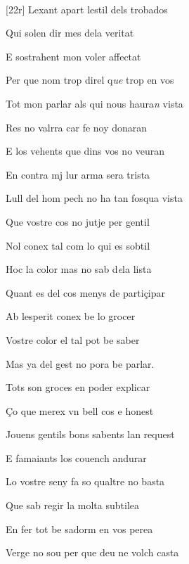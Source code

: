 \documentclass[12pt]{article}
\renewcommand{\espaiAbansEtiquetaPoema}{\vspace{0ex}}
\begin{document}
\begin{estrofa}

\espaiAbansEtiquetaPoema

\\

\end{estrofa}


\begin{estrofa}

 [22r] Lexant apart lestil dels trobados

 Qui solen dir mes dela veritat

 E sostrahent mon voler affectat

 Per que nom trop direl q\textit{ue} trop en vos

 Tot mon parlar als qui nous haura\textit{n} vista

 Res no valrra car fe noy donaran

 E los vehents que dins vos no veuran

 En contra mj lur arma sera trista

\end{estrofa}



\begin{estrofa}

 Lull del hom pech no ha tan fosqua vista

 Que vostre cos no jutje per gentil

 Nol conex tal com lo qui es sobtil

 Hoc la color mas no sab d\textit{e}la lista

 Quant es del cos menys de parti\c{c}ipar

 Ab lesperit conex be lo grocer

 Vostre color el tal pot be saber

 Mas ya del gest no pora be parlar.

\end{estrofa}



\begin{estrofa}

 Tots son groces en poder explicar

 \c{C}o que merex vn bell cos e honest

 Jouens gentils bons sabents lan request

 E famaiants los couench andurar

 Lo vostre seny fa so qualtre no basta

 Que sab regir la molta subtilea

 En fer tot be sadorm en vos perea

 Verge no sou per que deu ne volch casta

\end{estrofa}
\end{document}

